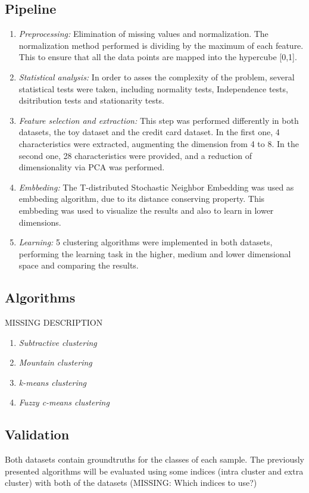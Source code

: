 \documentclass[conference]{IEEEtran}
\begin{document}
\subsection{Pipeline}
\begin{enumerate}
    \item \textit{Preprocessing: }Elimination of missing values and normalization. The normalization method performed is dividing by the maximum of each feature. This to ensure that all the data points are mapped into the hypercube [0,1].
    \item \textit{Statistical analysis:} In order to asses the complexity of the problem, several statistical tests were taken, including normality tests, Independence tests, dsitribution tests and stationarity tests. 
    \item \textit{Feature selection and extraction: }This step was performed differently in both datasets, the toy dataset and the credit card dataset. In the first one, 4 characteristics were extracted, augmenting the dimension from 4 to 8. In the second one, 28 characteristics were provided, and a reduction of dimensionality via PCA was performed.
    \item \textit{Embbeding: }The T-distributed Stochastic Neighbor Embedding was used as embbeding algorithm, due to its distance conserving property. This embbeding was used to visualize the results and also to learn in lower dimensions.
    \item \textit{Learning: }5 clustering algorithms were implemented in both datasets, performing the learning task in the higher, medium and lower dimensional space and comparing the results.
\end{enumerate}
\subsection{Algorithms}
MISSING DESCRIPTION
\begin{enumerate}
    \item \textit{Subtractive clustering}
    \item \textit{Mountain clustering}
    \item \textit{k-means clustering}
    \item \textit{Fuzzy c-means clustering}
\end{enumerate}
\subsection{Validation}
Both datasets contain groundtruths for the classes of each sample. The previously presented algorithms will be evaluated using some indices (intra cluster and extra cluster) with both of the datasets (MISSING: Which indices to use?)
\end{document}
